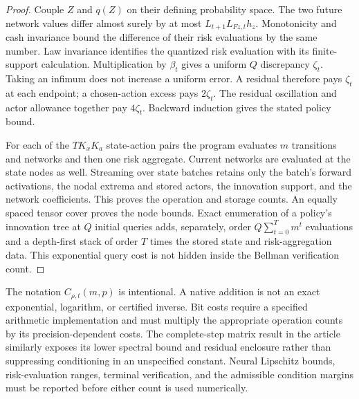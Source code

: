 \documentclass[ecta,nameyear,draft]{econsocart}
\theoremstyle{definition}
\theoremstyle{remark}
\begin{document}
\begin{proof}
Couple $Z$ and $q(Z)$ on their defining probability space. The two future
network values differ almost surely by at most
$L_{t+1}L_{Fz,t}h_z$. Monotonicity and cash invariance bound the difference
of their risk evaluations by the same number. Law invariance identifies
the quantized risk evaluation with its finite-support calculation.
Multiplication by $\beta_t$ gives a uniform $Q$ discrepancy $\zeta_t$.
Taking an infimum does not increase a uniform error. A residual therefore
pays $\zeta_t$ at each endpoint; a chosen-action excess pays $2\zeta_t$.
The residual oscillation and actor allowance together pay $4\zeta_t$.
Backward induction gives the stated policy bound.

For each of the $TK_xK_a$ state-action pairs the program evaluates $m$
transitions and networks and then one risk aggregate. Current networks
are evaluated at the state nodes as well. Streaming over state batches
retains only the batch's forward activations, the nodal extrema and stored
actors, the innovation support, and the network coefficients. This proves
the operation and storage counts. An equally spaced tensor cover proves
the node bounds. Exact enumeration of a policy's innovation tree at $Q$
initial queries adds, separately, order
$Q\sum_{t=0}^Tm^t$ evaluations and a depth-first stack of order $T$ times
the stored state and risk-aggregation data. This exponential query cost is
not hidden inside the Bellman verification count.
\end{proof}

The notation $C_{\rho,t}(m,p)$ is intentional. A native addition is not an
exact exponential, logarithm, or certified inverse. Bit costs require a
specified arithmetic implementation and must multiply the appropriate
operation counts by its precision-dependent costs. The complete-step
matrix result in the article similarly exposes its lower spectral bound
and residual enclosure rather than suppressing conditioning in an
unspecified constant. Neural Lipschitz bounds, risk-evaluation ranges,
terminal verification, and the admissible condition margins must be
reported before either count is used numerically.
\end{document}

